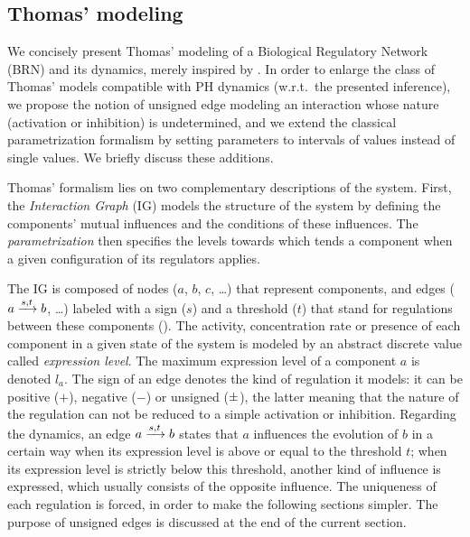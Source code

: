 \subsection{Thomas' modeling}

We concisely present Thomas' modeling of a Biological Regulatory Network (BRN) and its dynamics, merely inspired by
\cite{Richard06,BernotSemBRN}.
In order to enlarge the class of Thomas' models compatible with PH dynamics (w.r.t.~the presented
inference),
we propose the notion of unsigned edge modeling an interaction whose nature (activation or inhibition) is undetermined,
and we extend the classical parametrization formalism by setting parameters to intervals of values instead of single values.
We briefly discuss these additions.

\medskip

Thomas' formalism lies on two complementary descriptions of the system. First, the
\emph{Interaction Graph} (IG) models the structure of the system by defining the components'
mutual influences and the conditions of these influences.
The \emph{parametrization} then specifies the levels towards which tends a component when a given
configuration of its regulators applies.

The IG is composed of nodes ($a$, $b$, $c$, …) that represent components,
and edges ($a \xrightarrow{s, t} b$, …) labeled with a sign ($s$) and a threshold ($t$) that stand for regulations between these components ().
The activity, concentration rate or presence of each component in a given state of the system is modeled by an abstract discrete value called \emph{expression level}.
The maximum expression level of a component $a$ is denoted $l_a$.
The sign of an edge denotes the kind of regulation it models: it can be positive ($+$), negative ($-$) or unsigned ($\pm$),
the latter meaning that the nature of the regulation can not be reduced to a simple activation or inhibition.
Regarding the dynamics, an edge $a \xrightarrow{s, t} b$ states that $a$ influences the evolution of $b$ in a certain way when its expression level is above or equal to the threshold $t$;
when its expression level is strictly below this threshold, another kind of influence is expressed, which usually consists of the opposite influence.
The uniqueness of each regulation is forced, in order to make the following sections simpler.
The purpose of unsigned edges is discussed at the end of the current section.

